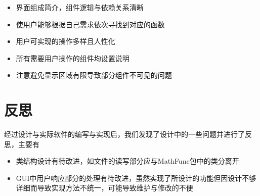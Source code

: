 \documentclass[hyperref, UTF8
,bookmarksnumbered=true, oneside]{ctexbook}
\begin{document}
	\begin{itemize}
		\item 界面组成简介，组件逻辑与依赖关系清晰
		\item 使用户能够根据自己需求依次寻找到对应的函数
		\item 用户可实现的操作多样且人性化
		\item 所有需要用户操作的组件均设置说明
		\item 注意避免显示区域有限导致部分组件不可见的问题
	\end{itemize}
	

\chapter{反思} %
\label{cha:}
	经过设计与实际软件的编写与实现后，我们发现了设计中的一些问题并进行了反思，主要有
	\begin{itemize}
		\item 类结构设计有待改进，如文件的读写部分应与MathFunc包中的类分离开
		\item GUI中用户响应部分的处理有待改进，虽然实现了所设计的功能但因设计不够详细而导致实现方法不统一，可能导致维护与修改的不便
	\end{itemize}
\end{document}
